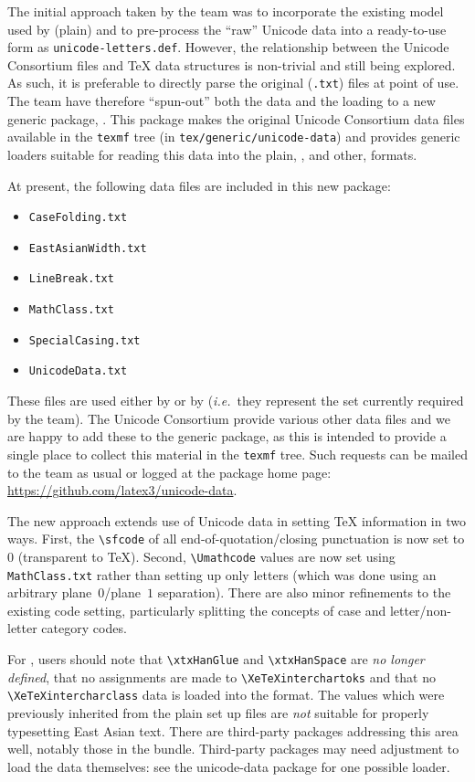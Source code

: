 \documentclass{ltnews}
\begin{document}
The initial approach taken by the team was to incorporate the existing model
used by (plain)  and to pre-process the ``raw'' Unicode data into
a ready-to-use form as \verb|unicode-letters.def|. However, the relationship
between the Unicode Consortium files and \TeX{} data structures is non-trivial and still
being explored. As such, it is preferable to directly parse the original
(\verb|.txt|) files at point of use. The team have therefore ``spun-out'' both
the data and the loading to a new generic package, . This
package makes the original Unicode Consortium data files available in the
\verb|texmf| tree (in \verb|tex/generic/unicode-data|) and provides generic
loaders suitable for reading this data into the plain, \LaTeXe{}, and other,
formats.

At present, the following data files are included in this new package:
\begin{itemize}\parskip=0pt
  \item \verb|CaseFolding.txt|
  \item \verb|EastAsianWidth.txt|
  \item \verb|LineBreak.txt|
  \item \verb|MathClass.txt|
  \item \verb|SpecialCasing.txt|
  \item \verb|UnicodeData.txt|
\end{itemize}
These files are used either by \LaTeXe{} or by 
(\emph{i.e.}~they represent the set currently required by the team). The
Unicode Consortium provide various other data files and we are happy to add
these to the generic package, as this is intended to provide a single place
to collect this material in the \verb|texmf| tree. Such requests can be
mailed to the team as usual or logged at the package home page:
\url{https://github.com/latex3/unicode-data}.

The new approach extends use of Unicode data in setting \TeX{} information in
two ways. First, the \verb|\sfcode| of all end-of-quotation/closing punctuation
is now set to $0$ (transparent to \TeX{}). Second, \verb|\Umathcode| values are
now set using \verb|MathClass.txt| rather than setting up only letters (which
was done using an arbitrary plane~$0$/plane~$1$ separation). There are also
minor refinements to the existing code setting, particularly splitting the
concepts of case and letter/non-letter category codes.

For , users should note that \verb|\xtxHanGlue| and
\verb|\xtxHanSpace| are \emph{no longer defined}, that no assignments are made
to \verb|\XeTeXinterchartoks| and that no \verb|\XeTeXintercharclass| data is
loaded into the format. The values which were previously inherited from
the plain  set up files are \emph{not} suitable for properly
typesetting East Asian text. There are third-party packages addressing this
area well, notably those in the  bundle. Third-party packages
may need adjustment to load the data themselves: see the \textsf{unicode-data}
package for one possible loader.
\end{document}
